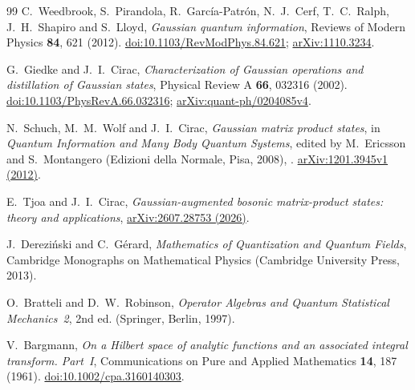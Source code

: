 \clearpage
{}
{}
\begin{thebibliography}{99}
C.~Weedbrook, S.~Pirandola, R.~Garc\'ia-Patr\'on, N.~J.~Cerf,
T.~C.~Ralph, J.~H.~Shapiro and S.~Lloyd,
\emph{Gaussian quantum information},
Reviews of Modern Physics \textbf{84}, 621 (2012).
\href{https://doi.org/10.1103/RevModPhys.84.621}{doi:10.1103/RevModPhys.84.621};
\href{https://arxiv.org/abs/1110.3234}{arXiv:1110.3234}.

G.~Giedke and J.~I.~Cirac,
\emph{Characterization of Gaussian operations and distillation of Gaussian states},
Physical Review A \textbf{66}, 032316 (2002).
\href{https://doi.org/10.1103/PhysRevA.66.032316}{doi:10.1103/PhysRevA.66.032316};
\href{https://arxiv.org/abs/quant-ph/0204085v4}{arXiv:quant-ph/0204085v4}.

N.~Schuch, M.~M.~Wolf and J.~I.~Cirac,
\emph{Gaussian matrix product states},
in \emph{Quantum Information and Many Body Quantum Systems},
edited by M.~Ericsson and S.~Montangero
 (Edizioni della Normale, Pisa, 2008), .
\href{https://arxiv.org/abs/1201.3945v1}{arXiv:1201.3945v1 (2012)}.

E.~Tjoa and J.~I.~Cirac,
\emph{Gaussian-augmented bosonic matrix-product states: theory and applications},
\href{https://arxiv.org/abs/2607.28753}{arXiv:2607.28753 (2026)}.

J.~Derezi\'nski and C.~G\'erard,
\emph{Mathematics of Quantization and Quantum Fields},
Cambridge Monographs on Mathematical Physics (Cambridge University Press, 2013).\newline
{}

O.~Bratteli and D.~W.~Robinson,
\emph{Operator Algebras and Quantum Statistical Mechanics~2}, 2nd ed.
(Springer, Berlin, 1997).

V.~Bargmann,
\emph{On a Hilbert space of analytic functions and an associated integral transform. Part~I},
Communications on Pure and Applied Mathematics \textbf{14}, 187 (1961).
\href{https://doi.org/10.1002/cpa.3160140303}{doi:10.1002/cpa.3160140303}.


\end{thebibliography}

